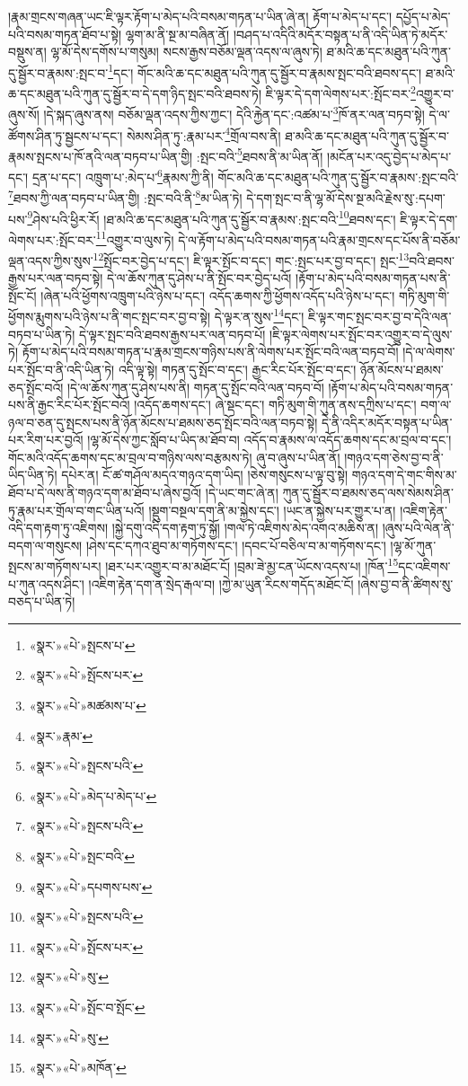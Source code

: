།རྣམ་གྲངས་གཞན་ཡང་ཇི་ལྟར་རྟོག་པ་མེད་པའི་བསམ་གཏན་པ་ཡིན་ཞེ་ན། རྟོག་པ་མེད་པ་དང་། དཔྱོད་པ་མེད་པའི་བསམ་གཏན་ཐོབ་པ་སྟེ། ལྷག་མ་ནི་སྔ་མ་བཞིན་ནོ། །བཤད་པ་འདིའི་མདོར་བསྟན་པ་ནི་འདི་ཡིན་ཏེ་མདོར་བསྡུས་ན། ལྷ་མོ་དེས་དགོས་པ་གསུམ། སངས་རྒྱས་བཅོམ་ལྡན་འདས་ལ་ཞུས་ཏེ། ཐ་མའི་ཆ་དང་མཐུན་པའི་ཀུན་དུ་སྦྱོར་བ་རྣམས་:སྤང་བ་\footnote{«སྣར་»«པེ་»སྤངས་པ་}དང་། གོང་མའི་ཆ་དང་མཐུན་པའི་ཀུན་དུ་སྦྱོར་བ་རྣམས་སྤང་བའི་ཐབས་དང་། ཐ་མའི་ཆ་དང་མཐུན་པའི་ཀུན་དུ་སྦྱོར་བ་དེ་དག་ཉིད་སྤང་བའི་ཐབས་ཏེ། ཇི་ལྟར་དེ་དག་ལེགས་པར་:སྤོང་བར་\footnote{«སྣར་»«པེ་»སྤོངས་པར་}འགྱུར་བ་ཞུས་སོ། །དེ་སྐད་ཞུས་ནས། བཅོམ་ལྡན་འདས་ཀྱིས་ཀྱང་། དེའི་རྐྱེན་དང་:འཚམ་པ་\footnote{«སྣར་»«པེ་»མཚམས་པ་}ཁོ་ནར་ལན་བཏབ་སྟེ། དེ་ལ་ཚོགས་ཤིན་ཏུ་སྦྱངས་པ་དང་། སེམས་ཤིན་ཏུ་:རྣམ་པར་\footnote{«སྣར་»རྣམ་}གྲོལ་བས་ནི། ཐ་མའི་ཆ་དང་མཐུན་པའི་ཀུན་དུ་སྦྱོར་བ་རྣམས་སྤངས་པ་ཁོ་ནའི་ལན་བཏབ་པ་ཡིན་གྱི། :སྤང་བའི་\footnote{«སྣར་»«པེ་»སྤངས་པའི་}ཐབས་ནི་མ་ཡིན་ནོ། །མངོན་པར་འདུ་བྱེད་པ་མེད་པ་དང་། དྲན་པ་དང་། འཁྲུག་པ་:མེད་པ་\footnote{«སྣར་»«པེ་»མེད་པ་མེད་པ་}རྣམས་ཀྱི་ནི། གོང་མའི་ཆ་དང་མཐུན་པའི་ཀུན་དུ་སྦྱོར་བ་རྣམས་:སྤང་བའི་\footnote{«སྣར་»«པེ་»སྤངས་པའི་}ཐབས་ཀྱི་ལན་བཏབ་པ་ཡིན་གྱི། :སྤང་བའི་ནི་\footnote{«སྣར་»«པེ་»སྤང་བའི་}མ་ཡིན་ཏེ། དེ་དག་སྤང་བ་ནི་ལྷ་མོ་དེས་སྔ་མའི་རྗེས་སུ་:དཔག་པས་\footnote{«སྣར་»«པེ་»དཔགས་པས་}ཤེས་པའི་ཕྱིར་རོ། །ཐ་མའི་ཆ་དང་མཐུན་པའི་ཀུན་དུ་སྦྱོར་བ་རྣམས་:སྤང་བའི་\footnote{«སྣར་»«པེ་»སྤངས་པའི་}ཐབས་དང་། ཇི་ལྟར་དེ་དག་ལེགས་པར་:སྤོང་བར་\footnote{«སྣར་»«པེ་»སྤོངས་པར་}འགྱུར་བ་ལུས་ཏེ། དེ་ལ་རྟོག་པ་མེད་པའི་བསམ་གཏན་པའི་རྣམ་གྲངས་དང་པོས་ནི་བཅོམ་ལྡན་འདས་ཀྱིས་སུས་\footnote{«སྣར་»«པེ་»སུ་}སྤོང་བར་བྱེད་པ་དང་། ཇི་ལྟར་སྤོང་བ་དང་། གང་:སྤང་པར་བྱ་བ་དང་། སྤང་\footnote{«སྣར་»«པེ་»སྤོང་བ་སྤོང་}བའི་ཐབས་རྒྱས་པར་ལན་བཏབ་སྟེ། དེ་ལ་ཆོས་ཀུན་དུ་ཤེས་པ་ནི་སྤོང་བར་བྱེད་པའོ། །རྟོག་པ་མེད་པའི་བསམ་གཏན་པས་ནི་སྤོང་ངོ། །ཞེན་པའི་ཕྱོགས་འཁྲུག་པའི་ཉེས་པ་དང་། འདོད་ཆགས་ཀྱི་ཕྱོགས་འདོད་པའི་ཉེས་པ་དང་། གཏི་མུག་གི་ཕྱོགས་རྨུགས་པའི་ཉེས་པ་ནི་གང་སྤང་བར་བྱ་བ་སྟེ། དེ་ལྟར་ན་སུས་\footnote{«སྣར་»«པེ་»སུ་}དང་། ཇི་ལྟར་གང་སྤང་བར་བྱ་བ་དེའི་ལན་བཏབ་པ་ཡིན་ཏེ། དེ་ལྟར་སྤང་བའི་ཐབས་རྒྱས་པར་ལན་བཏབ་པོ། །ཇི་ལྟར་ལེགས་པར་སྤོང་བར་འགྱུར་བ་དེ་ལུས་ཏེ། རྟོག་པ་མེད་པའི་བསམ་གཏན་པ་རྣམ་གྲངས་གཉིས་པས་ནི་ལེགས་པར་སྤོང་བའི་ལན་བཏབ་བོ། །དེ་ལ་ལེགས་པར་སྤོང་བ་ནི་འདི་ཡིན་ཏེ། འདི་ལྟ་སྟེ། གཏན་དུ་སྤོང་བ་དང་། རྒྱང་རིང་པོར་སྤོང་བ་དང་། ཉོན་མོངས་པ་ཐམས་ཅད་སྤོང་བའོ། །དེ་ལ་ཆོས་ཀུན་དུ་ཤེས་པས་ནི། གཏན་དུ་སྤོང་བའི་ལན་བཏབ་བོ། །རྟོག་པ་མེད་པའི་བསམ་གཏན་པས་ནི་རྒྱང་རིང་པོར་སྤོང་བའོ། །འདོད་ཆགས་དང་། ཞེ་སྡང་དང་། གཏི་མུག་གི་ཀུན་ནས་དཀྲིས་པ་དང་། བག་ལ་ཉལ་བ་ཅན་དུ་སྤངས་པས་ནི་ཉོན་མོངས་པ་ཐམས་ཅད་སྤོང་བའི་ལན་བཏབ་སྟེ། དེ་ནི་འདིར་མདོར་བསྟན་པ་ཡིན་པར་རིག་པར་བྱའོ། །ལྷ་མོ་དེས་ཀྱང་སློབ་པ་ཡིད་མ་ཐོབ་བ། འདོད་བ་རྣམས་ལ་འདོད་ཆགས་དང་མ་བྲལ་བ་དང་། གོང་མའི་འདོད་ཆགས་དང་མ་བྲལ་བ་གཉིས་ལས་བརྩམས་ཏེ། ཞུ་བ་ཞུས་པ་ཡིན་ནོ། །གཉའ་དག་ཅེས་བྱ་བ་ནི་ཡིད་ཡིན་ཏེ། དཔེར་ན། ངོ་ཚ་གཤོལ་མདའ་གཉའ་དག་ཡིད། །ཅེས་གསུངས་པ་ལྟ་བུ་སྟེ། གཉའ་དག་དེ་གང་གིས་མ་ཐོབ་པ་དེ་ལས་ནི་གཉའ་དག་མ་ཐོབ་པ་ཞེས་བྱའོ། །དེ་ཡང་གང་ཞེ་ན། ཀུན་དུ་སྦྱོར་བ་ཐམས་ཅད་ལས་སེམས་ཤིན་ཏུ་རྣམ་པར་གྲོལ་བ་གང་ཡིན་པའོ། །སྡུག་བསྔལ་དག་ནི་མ་སྐྱེས་དང་། །ཡང་ན་སྐྱེས་པར་གྱུར་པ་ན། །འཇིག་རྟེན་འདི་དག་རྟག་ཏུ་འཇིགས། །སྐྱེ་དགུ་འདི་དག་རྟག་ཏུ་སྐྱོ། །གལ་ཏེ་འཇིགས་མེད་འགའ་མཆིས་ན། །ཞུས་པའི་ལེན་ནི་བདག་ལ་གསུངས། །ཤེས་དང་དཀའ་ཐུབ་མ་གཏོགས་དང་། །དབང་པོ་བཅིལ་བ་མ་གཏོགས་དང་། །ལྷ་མོ་ཀུན་སྤངས་མ་གཏོགས་པར། །ཐར་པར་འགྱུར་བ་མ་མཐོང་ངོ། །བྲམ་ཟེ་མྱ་ངན་ཡོངས་འདས་པ། །ཁོན་\footnote{«སྣར་»«པེ་»མཁོན་}དང་འཇིགས་པ་ཀུན་འདས་ཤིང་། །འཇིག་རྟེན་དག་ན་སྲེད་རྒལ་བ། །ཀྱེ་མ་ཡུན་རིངས་གདོད་མཐོང་ངོ། །ཞེས་བྱ་བ་ནི་ཚིགས་སུ་བཅད་པ་ཡིན་ཏེ། 